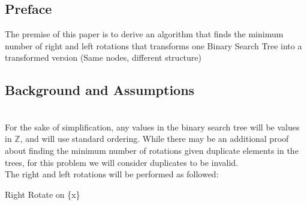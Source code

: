 \documentclass{assignment}
\date{\today}
\begin{document}
\begin{problem}

\section*{Preface}

\noindent The premise of this paper is to derive an algorithm  that finds the minimum number of right and left rotations that transforms one Binary Search Tree into a transformed version (Same nodes, different structure)

\subsection*{Background and Assumptions} \\

\noindent For the sake of simplification, any values in the binary search tree will be values in $\mathbb{Z}$, and will use standard ordering. While there may be an additional proof \cite{HERE} about finding the minimum number of rotations given duplicate elements in the trees, for this problem we will consider duplicates to be invalid. \\

\noindent The right and left rotations will be performed as followed: \\


\begin{center}

Right Rotate on \{x\}

\end{center}
\end{problem}
\end{document}
